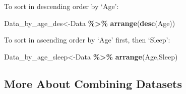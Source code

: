 \documentclass[
  openany]{book}
\newenvironment{Shaded}{\begin{snugshade}}{\end{snugshade}}
\newcommand{\FunctionTok}[1]{\textcolor[rgb]{0.13,0.29,0.53}{\textbf{#1}}}
\newcommand{\NormalTok}[1]{#1}
\newcommand{\OtherTok}[1]{\textcolor[rgb]{0.56,0.35,0.01}{#1}}
\newcommand{\SpecialCharTok}[1]{\textcolor[rgb]{0.81,0.36,0.00}{\textbf{#1}}}
\begin{document}
To sort in descending order by `Age':

\begin{Shaded}
\begin{Highlighting}[]
\NormalTok{Data\_by\_age\_des}\OtherTok{\textless{}{-}}\NormalTok{Data }\SpecialCharTok{\%\textgreater{}\%} 
  \FunctionTok{arrange}\NormalTok{(}\FunctionTok{desc}\NormalTok{(Age))}
\end{Highlighting}
\end{Shaded}

To sort in ascending order by `Age' first, then `Sleep':

\begin{Shaded}
\begin{Highlighting}[]
\NormalTok{Data\_by\_age\_sleep}\OtherTok{\textless{}{-}}\NormalTok{Data }\SpecialCharTok{\%\textgreater{}\%} 
  \FunctionTok{arrange}\NormalTok{(Age,Sleep)}
\end{Highlighting}
\end{Shaded}

\subsection{More About Combining Datasets}\label{more-about-combining-datasets}
\end{document}
